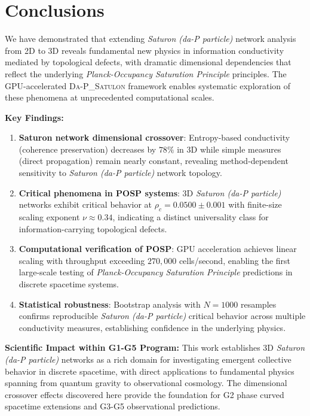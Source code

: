 \documentclass[twocolumn,showpacs,preprintnumbers,amsmath,amssymb,prb]{revtex4-2}
\newcommand{\satulon}{\textsc{Da-P\_Satulon}}
\newcommand{\saturon}{\textit{Saturon (da-P particle)}}
\newcommand{\posp}{\textit{Planck-Occupancy Saturation Principle}}
\begin{document}




\section{Conclusions}
\label{sec:conclusions}

We have demonstrated that extending \saturon{} network analysis from 2D to 3D reveals fundamental new physics in information conductivity mediated by topological defects, with dramatic dimensional dependencies that reflect the underlying \posp{} principles. The GPU-accelerated \satulon{} framework enables systematic exploration of these phenomena at unprecedented computational scales.

\textbf{Key Findings:}
\begin{enumerate}
\item \textbf{Saturon network dimensional crossover}: Entropy-based conductivity (coherence preservation) decreases by $78\%$ in 3D while simple measures (direct propagation) remain nearly constant, revealing method-dependent sensitivity to \saturon{} network topology.

\item \textbf{Critical phenomena in POSP systems}: 3D \saturon{} networks exhibit critical behavior at $\rho_c = 0.0500 \pm 0.001$ with finite-size scaling exponent $\nu \approx 0.34$, indicating a distinct universality class for information-carrying topological defects.

\item \textbf{Computational verification of POSP}: GPU acceleration achieves linear scaling with throughput exceeding $270,000$ cells/second, enabling the first large-scale testing of \posp{} predictions in discrete spacetime systems.

\item \textbf{Statistical robustness}: Bootstrap analysis with $N=1000$ resamples confirms reproducible \saturon{} critical behavior across multiple conductivity measures, establishing confidence in the underlying physics.
\end{enumerate}

\textbf{Scientific Impact within G1-G5 Program:} This work establishes 3D \saturon{} networks as a rich domain for investigating emergent collective behavior in discrete spacetime, with direct applications to fundamental physics spanning from quantum gravity to observational cosmology. The dimensional crossover effects discovered here provide the foundation for G2 phase curved spacetime extensions and G3-G5 observational predictions.
\end{document}
